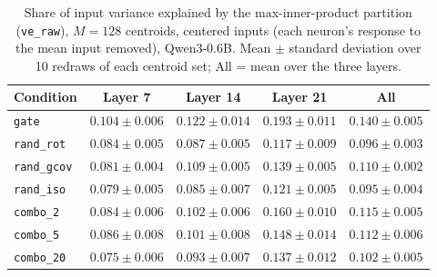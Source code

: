 \begin{table}[t]
\centering
\begin{tabular}{lcccc}
\toprule
Condition & Layer 7 & Layer 14 & Layer 21 & All \\
\midrule
\texttt{gate} & $0.104 \pm 0.006$ & $0.122 \pm 0.014$ & $0.193 \pm 0.011$ & $0.140 \pm 0.005$ \\
\addlinespace
\texttt{rand\_rot} & $0.084 \pm 0.005$ & $0.087 \pm 0.005$ & $0.117 \pm 0.009$ & $0.096 \pm 0.003$ \\
\texttt{rand\_gcov} & $0.081 \pm 0.004$ & $0.109 \pm 0.005$ & $0.139 \pm 0.005$ & $0.110 \pm 0.002$ \\
\texttt{rand\_iso} & $0.079 \pm 0.005$ & $0.085 \pm 0.007$ & $0.121 \pm 0.005$ & $0.095 \pm 0.004$ \\
\addlinespace
\texttt{combo\_2} & $0.084 \pm 0.006$ & $0.102 \pm 0.006$ & $0.160 \pm 0.010$ & $0.115 \pm 0.005$ \\
\texttt{combo\_5} & $0.086 \pm 0.008$ & $0.101 \pm 0.008$ & $0.148 \pm 0.014$ & $0.112 \pm 0.006$ \\
\texttt{combo\_20} & $0.075 \pm 0.006$ & $0.093 \pm 0.007$ & $0.137 \pm 0.012$ & $0.102 \pm 0.005$ \\
\bottomrule
\end{tabular}
\caption{Share of input variance explained by the max-inner-product partition (\texttt{ve\_raw}), $M = 128$ centroids, centered inputs (each neuron's response to the mean input removed), Qwen3-0.6B. Mean $\pm$ standard deviation over 10 redraws of each centroid set; All = mean over the three layers.}
\label{tab:ve-raw-ip-centered-M128}
\end{table}

